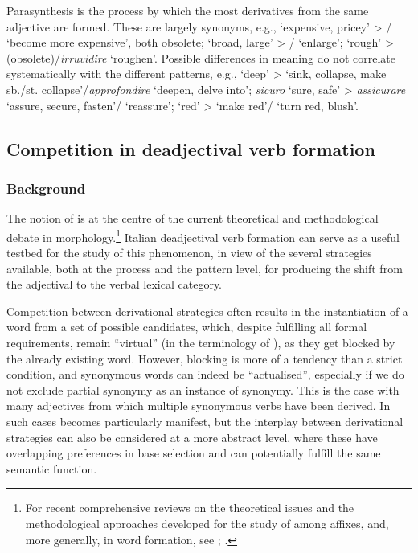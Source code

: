 \documentclass[output=paper,colorlinks,citecolor=brown]{langscibook}
\begin{document}
Parasynthesis is the process by which the most derivatives from the same adjective are formed. These are largely synonyms, e.g.,  ‘expensive, pricey’ > / ‘become more expensive’, both obsolete;  ‘broad, large’ > / ‘enlarge’;  ‘rough’ >  \mbox{(obsolete)/\mbox{\textit{irruvidire}}} ‘roughen’. Possible differences in meaning do not correlate systematically with the different patterns, e.g.,  ‘deep’ >  ‘sink, collapse, make sb./st. collapse’/\textit{approfondire} ‘deepen, delve into’; \textit{sicuro} ‘sure, safe’ > \textit{assicurare} ‘assure, secure, fasten’/ ‘reassure’;  ‘red’ >  ‘make red’/  ‘turn red, blush’.

 \subsection{Competition in deadjectival verb formation}
\label{sec:competition}

\subsubsection{Background}

The notion of  is at the centre of the current theoretical and methodological debate in morphology.\footnote{For recent comprehensive reviews on the theoretical issues and the methodological approaches developed for the study of  among affixes, and, more generally, in word formation, see \citet{HuygheVarvara2023}; \citet{NaganoEtAl2024}.} Italian deadjectival verb formation can serve as a useful testbed for the study of this phenomenon, in view of the several strategies available, both at the process and the pattern level, for producing the shift from the adjectival to the verbal lexical category.

Competition between derivational strategies often results in the instantiation of a word from a set of possible candidates, which, despite fulfilling all formal requirements, remain “virtual” (in the terminology of \citealt{Rainer2012}), as they get blocked by the already existing word. However, blocking is more of a tendency than a strict condition, and synonymous words can indeed be “actualised”, especially if we do not exclude partial synonymy as an instance of synonymy. This is the case with many adjectives from which multiple synonymous verbs have been derived. In such cases  becomes particularly manifest, but the interplay between derivational strategies can also be considered at a more abstract level, where these have overlapping preferences in base selection and can potentially fulfill the same semantic function.
\end{document}
